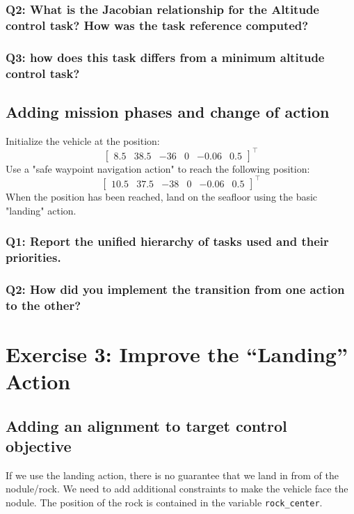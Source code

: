 \documentclass{article}
\begin{document}
\subsubsection{Q2: What is the Jacobian relationship for the Altitude control task? How was the task reference computed?}

\subsubsection{Q3: how does this task differs from a minimum altitude control task?}

\subsection{Adding mission phases and change of action}
Initialize the vehicle at the position:
\begin{displaymath}
\begin{bmatrix} 8.5 & 38.5 & -36 & 0 & -0.06 & 0.5 \end{bmatrix}^\top
\end{displaymath} 
Use a "safe waypoint navigation action" to reach the following position: 
\begin{displaymath}
\begin{bmatrix} 10.5 & 37.5 & -38 & 0 & -0.06 & 0.5 \end{bmatrix}^\top
\end{displaymath} 
When the position has been reached, land on the seafloor using the basic "landing" action.

\subsubsection{Q1: Report the unified hierarchy of tasks used and their priorities.}

\subsubsection{Q2: How did you implement the transition from one action to the other?}

\clearpage

\section{Exercise 3: Improve the “Landing” Action}
\subsection{Adding an alignment to target control objective}
If we use the landing action, there is no guarantee that we land in from of the nodule/rock. We need to add additional constraints to make the vehicle face the nodule. The position of the rock is contained in the variable \texttt{rock\_center}. 
\end{document}
